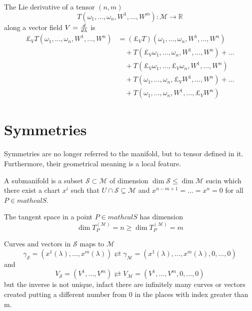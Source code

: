     The Lie derivative of a tensor $(n,m)$
    \begin{equation*}
        T (\omega_1, \ldots, \omega_n, W^1, \ldots, W^m) \colon \mathcal M \rightarrow \mathbb R
    \end{equation*} 
    along a vector field $V=\frac{d}{d\lambda}$ is
    \begin{equation*}
    \begin{aligned}
        \pounds_V T (\omega_1, \ldots, \omega_n, W^1, \ldots, W^n) & = (\pounds_V T) (\omega_1, \ldots, \omega_n, W^1, \ldots, W^n) \\ & \quad + T (\pounds_V \omega_1, \ldots, \omega_n, W^1, \ldots, W^n) + \ldots \\ & \quad + T (\pounds_V \omega_1, \ldots, \pounds_V \omega_n, W^1, \ldots, W^n) \\ & \quad + T (\omega_1, \ldots, \omega_n, \pounds_V W^1, \ldots, W^n) + \ldots \\ & \quad + T (\omega_1, \ldots, \omega_n, W^1, \ldots, \pounds_V W^n)
    \end{aligned}
    \end{equation*}

\section{Symmetries}

    Symmetries are no longer referred to the manifold, but to tensor defined in it. Furthermore, their geometrical meaning is a local feature.

    A submanifold is a subset $\mathcal S \subset \mathcal M$ of dimension $\dim \mathcal S \leq \dim \mathcal M$ sucin which there exist a chart $x^i$ such that $U \cap \mathcal S \subseteq \mathcal M$ and $x^{n-m+1} = \ldots = x^n = 0$ for all $P \in mathcal S$.

    The tangent space in a point $P \in mathcal S$ has dimension
    \begin{equation*}
        \dim T_P^{(\mathcal M)} = n \geq \dim T_P^{(\mathcal M)} = m
    \end{equation*}

    Curves and vectors in $\mathcal S$ maps to $\mathcal M$
    \begin{equation*}
        \gamma_{\mathcal S} = (x^1(\lambda), \ldots, x^m(\lambda)) \rightleftarrows \gamma_{\mathcal M} = (x^1(\lambda), \ldots, x^m(\lambda), 0, \ldots, 0)
    \end{equation*}
    and
    \begin{equation*}
        V_{\mathcal S} = (V^1, \ldots, V^m) \rightleftarrows V_{\mathcal M} = (V^1, \ldots, V^m, 0, \ldots, 0)
    \end{equation*}
    but the inverse is not unique, infact there are infinitely many curves or vectors created putting a different number from $0$ in the places with index greater than m. 

